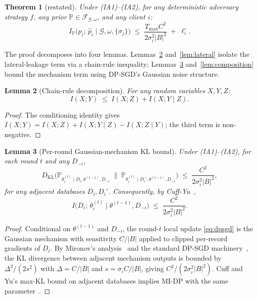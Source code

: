\documentclass[letterpaper,journal]{IEEEtran}
\newtheorem{theorem}{Theorem}[section]
\newtheorem{lemma}[theorem]{Lemma}
\newcommand{\KL}{D_{\mathrm{KL}}}
\newcommand{\TOPO}{\mathcal{G}}
\newcommand{\FAM}{\mathcal{F}}
\newcommand{\Tmax}{T_{\max}}
\begin{document}
\begin{theorem}[restated]
Under (IA1)--(IA2), for any deterministic adversary strategy $f$,
any prior $\mathbb{P} \in \FAM_{\TOPO,\omega}$, and any client $i$:
\[
I_{\mathbb{P}}\big(p_i;\,\hat p_i \;\big|\; \TOPO,\omega,\{\sigma_j\}\big)
\;\leq\;
\frac{\Tmax C^2}{2\sigma_i^2 |B|^2}
\;+\;
\ell_i^\circ.
\]
\end{theorem}

The proof decomposes into four lemmas. Lemmas~\ref{lem:chain}
and~\ref{lem:lateral} isolate the lateral-leakage term via a chain-rule
inequality; Lemmas~\ref{lem:perround} and~\ref{lem:composition} bound
the mechanism term using DP-SGD's Gaussian noise structure.

\begin{lemma}[Chain-rule decomposition]
\label{lem:chain}
For any random variables $X, Y, Z$:
\[
I(X;Y) \;\leq\; I(X;Z) + I(X;Y \mid Z).
\]
\end{lemma}
\begin{proof}
The conditioning identity gives
\(I(X;Y) = I(X;Z) + I(X;Y \mid Z) - I(X;Z \mid Y)\); the third term is
non-negative.
\end{proof}

\begin{lemma}[Per-round Gaussian-mechanism KL bound]
\label{lem:perround}
Under (IA1)--(IA2), for each round $t$ and any $D_{-i}$,
\[
\KL\Big(
\mathbb{P}_{\theta_i^{(t)} \mid D_i, \theta^{(t-1)}, D_{-i}}
\;\Big\|\;
\mathbb{P}_{\theta_i^{(t)} \mid D_i', \theta^{(t-1)}, D_{-i}}
\Big)
\;\leq\; \frac{C^2}{2\sigma_i^2 |B|^2},
\]
for any adjacent databases $D_i, D_i'$. Consequently, by
Cuff-Yu~\cite{cuff2016mi},
\[
I\big(D_i;\, \theta_i^{(t)} \;\big|\; \theta^{(t-1)}, D_{-i}\big)
\;\leq\; \frac{C^2}{2\sigma_i^2 |B|^2}.
\]
\end{lemma}
\begin{proof}
Conditional on $\theta^{(t-1)}$ and $D_{-i}$, the round-$t$ local update
\eqref{eq:dpsgd} is the Gaussian mechanism with sensitivity $C/|B|$
applied to clipped per-record gradients of $D_i$. By Mironov's
analysis~\cite{mironov2017rdp} and the standard DP-SGD machinery~\cite{abadi2016dpsgd},
the KL divergence between adjacent mechanism outputs is bounded by
$\Delta^2/(2s^2)$ with $\Delta = C/|B|$ and $s = \sigma_i C/|B|$, giving
$C^2/(2\sigma_i^2 |B|^2)$. Cuff and Yu's max-KL bound on
adjacent databases implies MI-DP with the same parameter~\cite{cuff2016mi}.
\end{proof}
\end{document}
